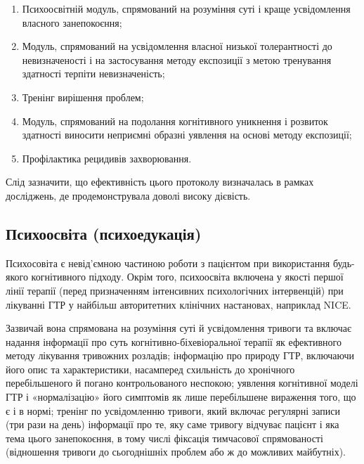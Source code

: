 \documentclass[twocolumn]{article}
\begin{document}
\begin{enumerate}
\item Психоосвітній модуль, спрямований на розуміння суті і краще усвідомлення власного занепокоєння;
\item Модуль, спрямований на усвідомлення власної низької толерантності до невизначеності і на застосування методу експозиції з метою тренування здатності терпіти невизначеність;
\item Тренінг вирішення проблем;
\item Модуль, спрямований на подолання когнітивного уникнення і розвиток здатності виносити неприємні образні уявлення на основі методу експозиції;
\item Профілактика рецидивів захворювання.
\end{enumerate}
\par Слід зазначити, що ефективність цього протоколу визначалась в рамках досліджень, де продемонструвала доволі високу дієвість\cite{bib15}.
\subsection{Психоосвіта (психоедукація)}
\par Психосовіта є невід’ємною частиною роботи з пацієнтом при використання будь-якого когнітивного підходу. Окрім того, психоосвіта включена у якості першої лінії терапії (перед призначенням інтенсивних психологічних інтервенцій) при лікуванні ГТР у найбільш авторитетних клінічних настановах, наприклад NICE\cite{bib16}.
\par Зазвичай вона спрямована на розуміння суті й усвідомлення тривоги та включає надання інформації про суть когнітивно-біхевіоральної терапії як ефективного методу лікування тривожних розладів; інформацію про природу ГТР, включаючи його опис та характеристики, насамперед схильність до хронічного перебільшеного й погано контрольованого неспокою; уявлення когнітивної моделі ГТР і «нормалізацію» його симптомів як лише перебільшене вираження того, що є і в нормі; тренінг по усвідомленню тривоги, який включає регулярні записи (три рази на день) інформації про те, яку саме тривогу відчуває пацієнт і яка тема цього занепокоєння, в тому числі фіксація тимчасової спрямованості (відношення тривоги до сьогоднішніх проблем або ж до можливих майбутніх).
\end{document}
